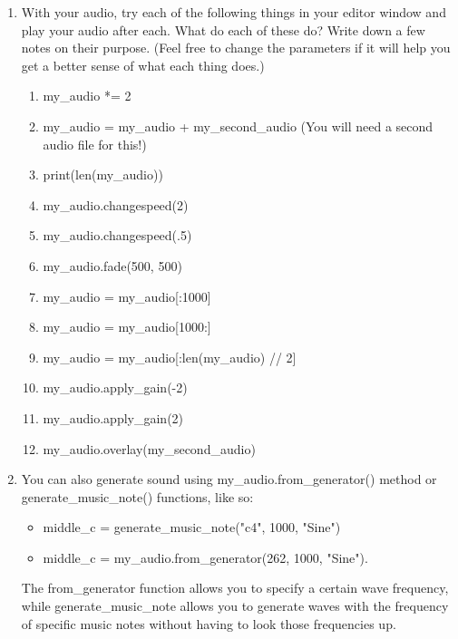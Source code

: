 \documentclass[11pt, letterpaper, onecolumn, oneside, final]{article}
\begin{document}
\begin{enumerate}
\newpage
\item With your audio, try each of the following things in your editor window and play your audio after each. What do each of these do? Write down a few notes on their purpose. (Feel free to change the parameters if it will help you get a better sense of what each thing does.)
    \begin{enumerate}
        \item {\consolas my\_audio *= 2} \\
        \item {\consolas my\_audio = my\_audio + my\_second\_audio} (You will need a second audio file for this!) \\
        \item {\consolas print(len(my\_audio))} \\ 
        \item {\consolas my\_audio.changespeed(2)} \\
        \item {\consolas my\_audio.changespeed(.5)} \\
        \item {\consolas my\_audio.fade(500, 500)} \\
        \item {\consolas my\_audio = my\_audio[:1000]} \\
        \item {\consolas my\_audio = my\_audio[1000:]} \\
        \item {\consolas my\_audio = my\_audio[:len(my\_audio) // 2]} \\
        \item {\consolas my\_audio.apply\_gain(-2)} \\
        \item {\consolas my\_audio.apply\_gain(2)} \\
        \item {\consolas my\_audio.overlay(my\_second\_audio)}
    \end{enumerate}

\item You can also generate sound using {\consolas my\_audio.from\_generator()} method or {\consolas generate\_music\_note()} functions, like so: 
    \begin{itemize}
        \item {\consolas middle\_c = generate\_music\_note("c4", 1000, "Sine")}
        \item {\consolas middle\_c = my\_audio.from\_generator(262, 1000, "Sine")}.
    \end{itemize}
    The {\consolas from\_generator} function allows you to specify a certain wave frequency, while {\consolas generate\_music\_note} allows you to generate waves with the frequency of specific music notes without having to look those frequencies up. 


\end{enumerate}
\end{document}
